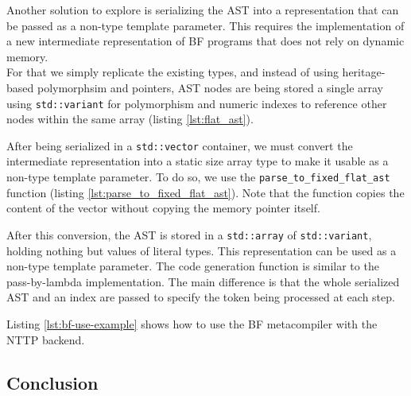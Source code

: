 \documentclass[../../main.tex]{subfiles}
\begin{document}
Another solution to explore is serializing the AST into a representation that
can be passed as a non-type template parameter. This requires the
implementation of a new intermediate representation of BF programs that does
not rely on dynamic memory.\\

For that we simply replicate the existing types, and instead of using
heritage-based polymorphsim and pointers, AST nodes are being stored a single
array using \lstinline|std::variant| for polymorphism and numeric indexes to
reference other nodes within the same array (listing \ref{lst:flat_ast}).





After being serialized in a \lstinline|std::vector| container, we must convert
the intermediate representation into a static size array type to make it usable
as a non-type template parameter. To do so, we use the
\lstinline|parse_to_fixed_flat_ast| function
(listing \ref{lst:parse_to_fixed_flat_ast}). Note that the function copies the content of
the vector without copying the memory pointer itself.



After this conversion, the AST is stored in a \lstinline|std::array| of
\lstinline|std::variant|, holding nothing but values of literal types. This
representation can be used as a non-type template parameter. The code
generation function is similar to the pass-by-lambda implementation. The main
difference is that the whole serialized AST and an index are passed to specify
the token being processed at each step.

Listing \ref{lst:bf-use-example} shows how to use the BF metacompiler with the
NTTP backend.

\subsection{Conclusion}
\end{document}
